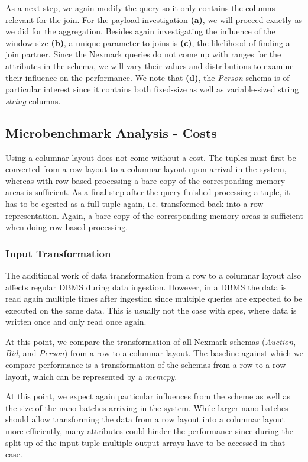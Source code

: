As a next step, we again modify the query so it only contains the columns relevant for the join.
For the payload investigation \textbf{(a)}, we will proceed exactly as we did for the aggregation.
Besides again investigating the influence of the window size \textbf{(b)}, a unique parameter to joins is \textbf{(c)}, the likelihood of finding a join partner.
Since the Nexmark queries do not come up with ranges for the attributes in the schema, we will vary their values and distributions to examine their influence on the performance.
We note that \textbf{(d)}, the \emph{Person} schema is of particular interest since it contains both fixed-size as well as variable-sized string \emph{string} columns.

\subsection{Microbenchmark Analysis - Costs}

Using a columnar layout does not come without a cost.
The tuples must first be converted from a row layout to a columnar layout upon arrival in the system, whereas with row-based processing a bare copy of the corresponding memory areas is sufficient.
As a final step after the query finished processing a tuple, it has to be egested as a full tuple again, i.e. transformed back into a row representation.
Again, a bare copy of the corresponding memory areas is sufficient when doing row-based processing.

\subsubsection{Input Transformation}
The additional work of data transformation from a row to a columnar layout also affects regular DBMS during data ingestion.
However, in a DBMS the data is read again multiple times after ingestion since multiple queries are expected to be executed on the same data.
This is usually not the case with \acp{spe}, where data is written once and only read once again.

At this point, we compare the transformation of all Nexmark schemas (\emph{Auction}, \emph{Bid}, and \emph{Person}) from a row to a columnar layout.
The baseline against which we compare performance is a transformation of the schemas from a row to a row layout, which can be represented by a \emph{memcpy}.


At this point, we expect again particular influences from the scheme as well as the size of the nano-batches arriving in the system.
While larger nano-batches should allow transforming the data from a row layout into a columnar layout more efficiently, many attributes could hinder the performance since during the split-up of the input tuple multiple output arrays have to be accessed in that case.


